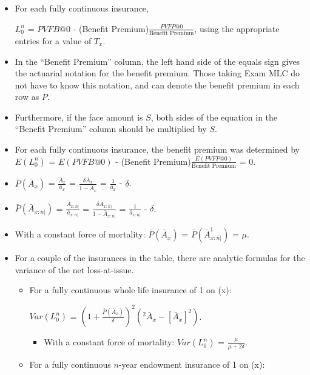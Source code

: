 \documentclass[]{book}
\providecommand{\tightlist}{%
  \setlength{\itemsep}{0pt}\setlength{\parskip}{0pt}}
\begin{document}
\begin{itemize}
\item
  For each fully continuous insurance,

  \(L^n_0\) = \(PVFB@0\) - (Benefit
  Premium)\(\frac{PVFP@0}{\text{Benefit
  Premium}}\), using the appropriate entries for a value of \(T_x\).
\item
  In the ``Benefit Premium'' column, the left hand side of the equals
  sign gives the actuarial notation for the benefit premium. Those
  taking Exam MLC do not have to know this notation, and can denote the
  benefit premium in each row as \(P\).
\item
  Furthermore, if the face amount is \(S\), both sides of the equation
  in the ``Benefit Premium'' column should be multiplied by \(S\).
\item
  For each fully continuous insurance, the benefit premium was
  determined by \(E(L^n_0)\) = \(E(PVFB@0)\) - (Benefit
  Premium)\(\frac{E(PVFP@0)}{\text{Benefit Premium}}\) = 0.
\item
  \(\bar{P}(\bar{A}_x)\) = \(\frac{\bar{A}_x}{\bar{a}_x}\) =
  \(\frac{\delta \bar{A}_x}{1 - \bar{A}_x}\) = \(\frac{1}{\bar{a}_x}\) -
  \(\delta\).
\item
  \(\bar{P}(\bar{A}_{x:\overline{n}|})\) =
  \(\frac{\bar{A}_{x:\overline{n}|}}{\bar{a}_{x:\overline{n}|}}\) =
  \(\frac{\delta \bar{A}_{x:\overline{n}|}}{1 - \bar{A}_{x:\overline{n}|}}\)
  = \(\frac{1}{\bar{a}_{x:\overline{n}|}}\) - \(\delta\).
\item
  With a constant force of mortality: \(\bar{P}(\bar{A}_x)\) =
  \(\bar{P}(\bar{A}_{x:\overline{n}|}^{1})\) = \(\mu\).
\item
  For a couple of the insurances in the table, there are analytic
  formulas for the variance of the net loss-at-issue.

  \begin{itemize}
  \item
    For a fully continuous whole life insurance of 1 on (x):

    \(Var(L^n_0)\) =
    \((1 + \frac{\bar{P}(\bar{A}_x)}{\delta})^2\)\((^2\bar{A}_x - [\bar{A}_x]^2)\).

    \begin{itemize}
    \tightlist
    \item
      With a constant force of mortality: \(Var(L^n_0)\) =
      \(\frac{\mu}{\mu + 2\delta}\).
    \end{itemize}
  \item
    For a fully continuous \(n\)-year endowment insurance of 1 on (x):


\end{itemize}
\end{itemize}
\end{document}
